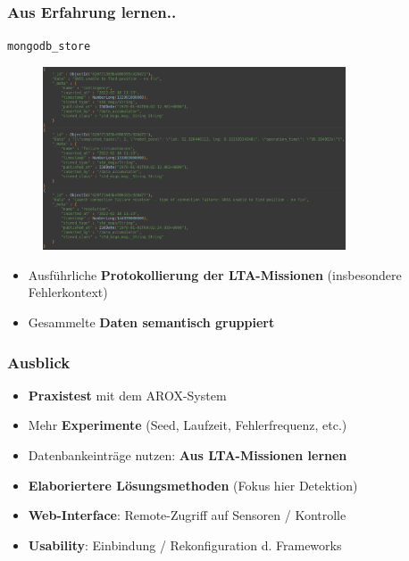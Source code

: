 \documentclass{beamer}
\newcommand{\code}[1]{\colorbox{light-gray}{\texttt{#1}}}
\begin{document}
\begin{frame}
  \frametitle{Aus Erfahrung lernen..}
  \code{mongodb\_store}
  \begin{figure}[H]
    \centering
    \includegraphics[width=0.8\textwidth]{img/database_entries.png}
  \end{figure}
  \begin{itemize}
    \item Ausführliche \textbf{Protokollierung der LTA-Missionen} (insbesondere Fehlerkontext)
    \item Gesammelte \textbf{Daten semantisch gruppiert}
  \end{itemize}
\end{frame}

\begin{frame}
  \frametitle{Ausblick}
  \begin{itemize}
    \item \textbf{Praxistest} mit dem AROX-System
    \item Mehr \textbf{Experimente} (Seed, Laufzeit, Fehlerfrequenz, etc.)
    \item Datenbankeinträge nutzen: \textbf{Aus LTA-Missionen lernen}
    \item \textbf{Elaboriertere Lösungsmethoden} (Fokus hier Detektion)
    \item \textbf{Web-Interface}: Remote-Zugriff auf Sensoren / Kontrolle
    \item \textbf{Usability}: Einbindung / Rekonfiguration d. Frameworks
  \end{itemize}
\end{frame}

\begin{frame}[allowframebreaks]
  
  
\end{frame}
\end{document}
